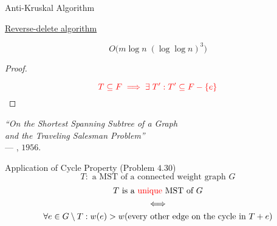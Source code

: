 \begin{frame}{}
  \begin{exampleblock}{Anti-Kruskal Algorithm}
    \centerline{\href{https://en.wikipedia.org/wiki/Reverse-delete_algorithm}{Reverse-delete algorithm }}
  \end{exampleblock}

  \pause
  \[
    O\Big(m \log n\; (\log \log n)^3\Big)
  \]

  \pause
  \begin{proof}
    \centerline{}
    \pause
    \[
      \textcolor{red}{T \subseteq F \implies \exists\; T': T' \subseteq F - \left\{e\right\}}
    \]
  \end{proof}

  \pause
  \vspace{0.20cm}
  \begin{center}
    {\it ``On the Shortest Spanning Subtree of a Graph \\
    and the Traveling Salesman Problem''} \\
    \hfill --- , $1956$.
  \end{center}
\end{frame}

\begin{frame}{}
  \begin{exampleblock}{Application of Cycle Property (Problem $4.30$)}
    \[
      T: \text{ a MST of a connected weight graph } G
    \]
    \begin{gather*}
      T \text{ is a \textcolor{red}{unique} MST of } G \\
      \iff \\
      \forall e \in G \setminus T:
      w(e) > w(\text{every other edge on the cycle in $T + e$})
    \end{gather*}
  \end{exampleblock}

  \pause
\end{frame}

